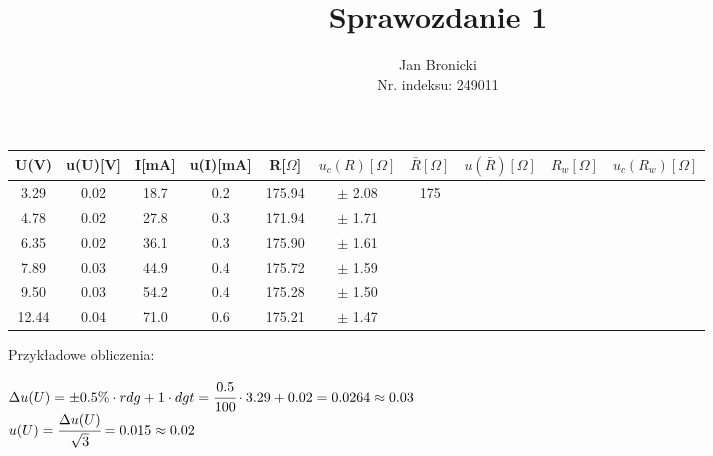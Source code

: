 \documentclass{article}
\title{Sprawozdanie 1}
\author{Jan Bronicki\\
Nr. indeksu: 249011}
\date{}
\begin{document}
\maketitle



\begin{center}
    \renewcommand{\arraystretch}{1.3}
\begin{tabular}{ |c|c|c|c|c|c|c|c|c|c| }
    \hline
    U(V)&u(U)[V]&I[mA]&u(I)[mA]&R[$\Omega$]&$u_c(R)[\Omega]$&$\bar{R}[\Omega]$&$u(\bar{R})[\Omega]$&$R_w[\Omega]$&$u_c(R_w)[\Omega]$ \\
    \hline \hline
    3.29&0.02&18.7&0.2&175.94&$\pm$ 2.08& \multirow{6}{*}{175}&&&\\ 
    \cline{1-6}
    \cline{9-10}
    4.78&0.02&27.8&0.3&171.94&$\pm$ 1.71&&&&\\ 
    \cline{1-6}
    \cline{9-10}
    6.35&0.02&36.1&0.3&175.90&$\pm$ 1.61&&&&\\ 
    \cline{1-6}
    \cline{9-10}
    7.89&0.03&44.9&0.4&175.72&$\pm$ 1.59&&&&\\ 
    \cline{1-6}
    \cline{9-10}
    9.50&0.03&54.2&0.4&175.28&$\pm$ 1.50&&&&\\ 
    \cline{1-6}
    \cline{9-10}
    12.44&0.04&71.0&0.6&175.21&$\pm$ 1.47&&&&\\ 
    \hline
\end{tabular}
\end{center}
Przykładowe obliczenia:
\begin{center}
    $\Delta u(U)  = \pm0.5\% \cdot rdg+1 \cdot dgt=\cfrac{0.5}{100} \cdot 3.29 + 0.02=0.0264\approx0.03$\\
    $u(U)=\cfrac{\Delta u(U)}{\sqrt{3}}=0.015\approx0.02$
\end{center}
\end{document}
